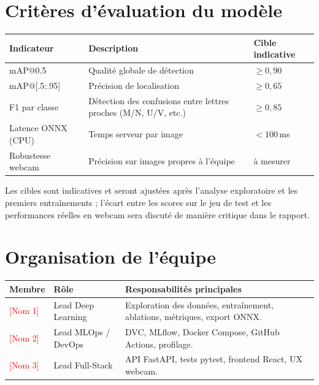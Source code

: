\documentclass[11pt,a4paper]{article}
\newcommand{\todo}[1]{\textcolor{red}{[#1]}}
\begin{document}
\section{Critères d'évaluation du modèle}

\begin{center}
\begin{tabular}{@{}lp{6.5cm}l@{}}
\toprule
\textbf{Indicateur} & \textbf{Description} & \textbf{Cible indicative} \\ \midrule
mAP@0.5 & Qualité globale de détection & $\geq 0{,}90$ \\
mAP@[.5:.95] & Précision de localisation & $\geq 0{,}65$ \\
F1 par classe & Détection des confusions entre lettres proches (M/N, U/V, etc.) & $\geq 0{,}85$ \\
Latence ONNX (CPU) & Temps serveur par image & $< 100$\,ms \\
Robustesse webcam & Précision sur images propres à l'équipe & à mesurer \\ \bottomrule
\end{tabular}
\end{center}

Les cibles sont indicatives et seront ajustées après l'analyse exploratoire et les premiers entraînements ; l'écart entre les scores sur le jeu de test et les performances réelles en webcam sera discuté de manière critique dans le rapport.

\section{Organisation de l'équipe}

\begin{center}
\begin{tabular}{@{}p{3.5cm}p{3cm}p{6.5cm}@{}}
\toprule
\textbf{Membre} & \textbf{Rôle} & \textbf{Responsabilités principales} \\ \midrule
\todo{Nom 1} & Lead Deep Learning & Exploration des données, entraînement, ablations, métriques, export ONNX. \\
\todo{Nom 2} & Lead MLOps / DevOps & DVC, MLflow, Docker Compose, GitHub Actions, profilage. \\
\todo{Nom 3} & Lead Full-Stack & API FastAPI, tests pytest, frontend React, UX webcam. \\ \bottomrule
\end{tabular}
\end{center}
\end{document}
